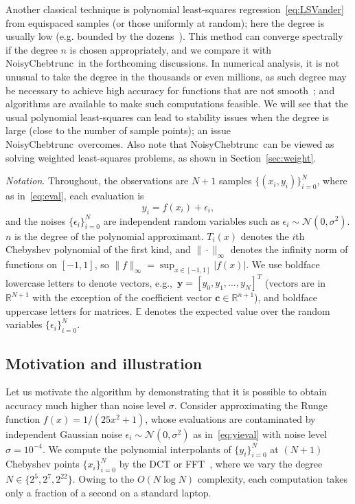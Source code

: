 \documentclass[final,onefignum,onetabnum]{siamart220329}
\def\mainalg{NoisyChebtrunc}
\newcommand{\vct}[1]{\bm{#1}}
\begin{document}
\begin{itemize}
	
	Another classical technique is polynomial least-squares regression~\eqref{eq:LSVander} from equispaced samples (or those uniformly at random); 
	here the degree is usually low (e.g. bounded by the dozens~\cite[Sec.~1.1]{bishop2006pattern}). 
	This method can converge spectrally if the degree $n$ is chosen appropriately, and we compare it with \mainalg\ in the forthcoming discussions. 
	In numerical analysis, it is not unusual to take the degree in the thousands or even millions, as such degree may be necessary to achieve high accuracy for functions that are not smooth~\cite{trefethenatap}; and algorithms are available to make such computations feasible. 
	We will see that the usual polynomial least-squares can lead to stability issues when the degree is large (close to the number of sample points); an issue \mainalg\  overcomes. 
	Also note that \mainalg\ can be viewed as solving weighted least-squares problems, as shown in Section~\ref{sec:weight}.
\end{itemize}


{\it Notation}. Throughout, the observations are $N+1$ samples 
$\{(x_i,y_i)\}_{i=0}^N$, where as in~\eqref{eq:eval}, each evaluation is 
\begin{equation} \label{eq:yieval}  
	y_i=f(x_i)   + \epsilon_i, 
\end{equation}
and the noises $\{ \epsilon_i \}_{i=0}^N$ are independent random variables such as $\epsilon_i \sim \mathcal{N}(0,\sigma^2)$.
$n$ is the degree of the polynomial approximant. $T_i(x)$ denotes the $i$th Chebyshev polynomial of the first kind, and $\|\cdot\|_\infty$ denotes the infinity norm of functions on $[-1,1]$, so $\|f\|_\infty=\sup_{x\in[-1,1]}|f(x)|$. We use boldface lowercase letters to denote vectors, e.g.,~$\vct{y}=[y_0,y_1,\ldots,y_N]^T$ (vectors are in $\mathbb{R}^{N+1}$ with the exception of the coefficient vector $\vct{c} \in \mathbb{R}^{n+1}$), and boldface uppercase letters for matrices. $\mathbb{E}$ denotes the expected value over the random variables $\{ \epsilon_i \}_{i=0}^N$. 

\subsection{Motivation and illustration} 

{Let us motivate the algorithm by demonstrating that it is possible to obtain accuracy much higher than noise level $\sigma$.} Consider approximating the Runge function $f(x)=1/(25x^2+1)$, whose evaluations are contaminated by independent Gaussian noise $\epsilon_i \sim \mathcal{N}(0,\sigma^2)$ as in~\eqref{eq:yieval} with noise level $\sigma=10^{-4}$.
We compute the polynomial interpolants of $\{ y_i \}_{i=0}^N$ at $(N+1)$ Chebyshev points $\{ x_i \}_{i=0}^N$ by the DCT or FFT~\cite{strang1999discrete,trefethen2000spectral}, where we vary the degree $N\in \{2^5,2^{7},2^{22}\}$. 
{Owing to the $O(N\log N)$ complexity, each computation takes only a fraction of a second on a standard laptop.}
\end{document}
